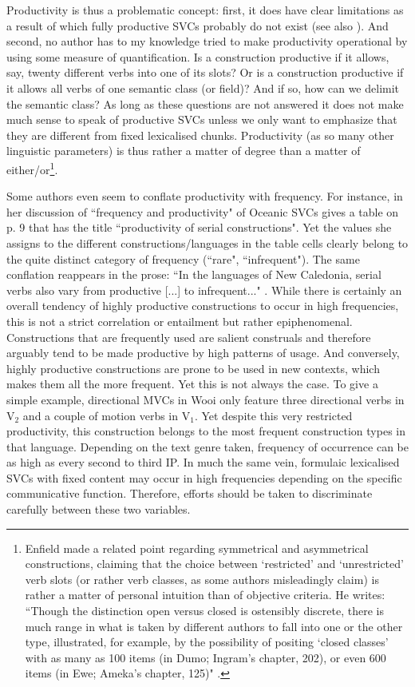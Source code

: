 Productivity is thus a problematic concept: first, it does have clear limitations as a result of which fully productive SVCs probably do not exist (see also \citealt[40]{sebba1987syntax}). And second, no author has to my knowledge tried to make productivity operational by using some measure of quantification. Is a construction productive if it allows, say, twenty different verbs into one of its slots? Or is a construction productive if it allows all verbs of one semantic class (or field)? And if so, how can we delimit the semantic class? As long as these questions are not answered it does not make much sense to speak of productive SVCs unless we only want to emphasize that they are different from fixed lexicalised chunks. Productivity (as so many other linguistic parameters) is thus rather a matter of degree than a matter of either/or\footnote{Enfield made a related point regarding symmetrical and asymmetrical constructions, claiming that the choice between `restricted' and `unrestricted' verb slots (or rather verb classes, as some authors misleadingly claim) is rather a matter of personal intuition than of objective criteria. He writes: ``Though the distinction open versus closed is ostensibly discrete, there is much range in what is taken by different authors to fall into one or the other type, illustrated, for example, by the possibility of positing `closed classes’ with as many as 100 items (in Dumo; Ingram’s chapter, 202), or even 600 items (in Ewe; Ameka’s chapter, 125)" \citep[449]{enfield2009review}.}.

Some authors even seem to conflate productivity with frequency. For instance, \citet{bril2004complex} in her discussion of ``frequency and productivity" of Oceanic SVCs gives a table on p. 9 that has the title ``productivity of serial constructions". Yet the values she assigns to the different constructions/languages in the table cells clearly belong to the quite distinct category of frequency (``rare", ``infrequent"). The same conflation reappears in the prose: ``In the languages of New Caledonia, serial verbs also vary from productive [...] to infrequent..." \citep[10]{bril2004complex}. While there is certainly an overall tendency of highly productive constructions to occur in high frequencies, this is not a strict correlation or entailment but rather epiphenomenal. Constructions that are frequently used are salient construals and therefore arguably tend to be made productive by high patterns of usage. And conversely, highly productive constructions are prone to be used in new contexts, which makes them all the more frequent. Yet this is not always the case. To give a simple example, directional MVCs in Wooi only feature three directional verbs in V$_2$ and a couple of motion verbs in V$_1$. Yet despite this very restricted productivity, this construction belongs to the most frequent construction types in that language. Depending on the text genre taken, frequency of occurrence can be as high as every second to third IP. In much the same vein, formulaic lexicalised SVCs with fixed content may occur in high frequencies depending on the specific communicative function. Therefore, efforts should be taken to discriminate carefully between these two variables.

